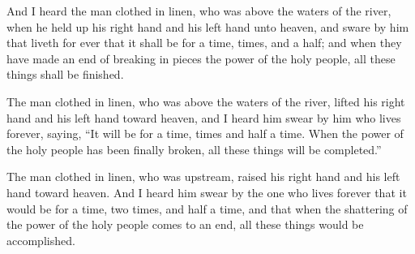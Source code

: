 			\begin{versebox}
					\item[BHS] 
					\item[LXX] 
					\item[ASV] And I heard the man clothed in linen, who was above the waters of the river, when he held up his right hand and his left hand unto heaven, and sware by him that liveth for ever that it shall be for a time, times, and a half; and when they have made an end of breaking in pieces the power of the holy people, all these things shall be finished.
					\item[NIV] The man clothed in linen, who was above the waters of the river, lifted his right hand and his left hand toward heaven, and I heard him swear by him who lives forever, saying, “It will be for a time, times and half a time. When the power of the holy people has been finally broken, all these things will be completed.”
					\item[NRSV] The man clothed in linen, who was upstream, raised his right hand and his left hand toward heaven. And I heard him swear by the one who lives forever that it would be for a time, two times, and half a time, and that when the shattering of the power of the holy people comes to an end, all these things would be accomplished.
			\end{versebox}

